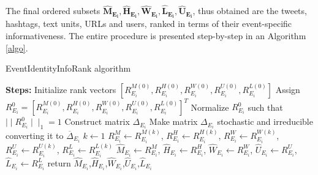 The final ordered subsets $\mathbf{\hat{M}_{E_{i}}, \hat{H}_{E_{i}}, \hat{W}_{E_{i}}, \hat{L}_{E_{i}}, \hat{U}_{E_{i}}}$,  thus obtained are the tweets, hashtags, text units, URLs and users, ranked in terms of their event-specific informativeness. The entire procedure is presented step-by-step in an Algorithm \ref{algo}.

\begin{algorithm}
\caption{EventIdentityInfoRank algorithm}
\label{algo}
\BlankLine
{}
\BlankLine
\textbf{Steps:}
\BlankLine
Initialize rank vectors $[R_{{E_{i}}}^{M(0)}, R_{{E_{i}}}^{H(0)}, R_{{E_{i}}}^{W(0)}, R_{{E_{i}}}^{U(0)}, R_{{E_{i}}}^{L(0)}]$\;
\BlankLine
Assign $R_{E_{i}}^{0}=[R_{E_{i}}^{M(0)},R_{E_{i}}^{H(0)},R_{E_{i}}^{W(0)},R_{E_{i}}^{U(0)},R_{E_{i}}^{L(0)}]^{T} $\;
\BlankLine
Normalize $R_{E_{i}}^{0}$ such that $\mid \mid R_{E_{i}}^{0}\mid \mid_{1} = 1$ \;
\BlankLine
Construct matrix $\Delta_{E_{i}}$\;
\BlankLine
Make matrix $\Delta_{E_{i}}$ stochastic and irreducible converting it to $\overline \Delta_{E_{i}}$\;
\BlankLine
$k \leftarrow 1$ 
\BlankLine
{}
\BlankLine
$R_{E_{i}}^{M} \leftarrow R_{E_{i}}^{M(k)}$, $R_{E_{i}}^{H} \leftarrow R_{E_{i}}^{H(k)}$, $R_{E_{i}}^{W} \leftarrow R_{E_{i}}^{W(k)}$,  $R_{E_{i}}^{U} \leftarrow R_{E_{i}}^{U(k)}$, $R_{E_{i}}^{L} \leftarrow R_{E_{i}}^{L(k)}$\;
\BlankLine
$\hat{M}_{E_{i}} \leftarrow R_{E_{i}}^{M}$, $\hat{H}_{E_{i}} \leftarrow R_{E_{i}}^{H}$, $\hat{W}_{E_{i}} \leftarrow R_{E_{i}}^{W}$, $\hat{U}_{E_{i}} \leftarrow R_{E_{i}}^{U}$, $\hat{L}_{E_{i}} \leftarrow R_{E_{i}}^{L}$\;
\BlankLine
return $\hat{M}_{E_{i}}$,$\hat{H}_{E_{i}}$,$\hat{W}_{E_{i}}$,$\hat{U}_{E_{i}}$,$\hat{L}_{E_{i}}$\;
\end{algorithm}\DecMargin{1em}


